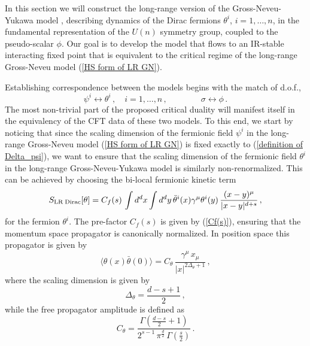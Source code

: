 \documentclass[aps,amsmath,amssymb,prd,showpacs,floatfix,preprint,superscriptaddress,nofootinbib,12pt]{article}
\begin{document}
In this section we will construct the long-range version of the
Gross-Neveu-Yukawa model \cite{Zinn-Justin:1991ksq}, describing
dynamics of the Dirac fermions $\theta^i$, $i=1,\dots,n$,
in the fundamental representation of the $U(n)$ symmetry group,
coupled to the pseudo-scalar $\phi$.
Our goal is to develop the model that flows to an IR-stable interacting fixed point
that is equivalent to the critical regime of the long-range Gross-Neveu model (\ref{HS form of LR GN}).

Establishing
 correspondence between the models begins
with the match of d.o.f.,
\begin{equation}
\psi^i\leftrightarrow\theta^i\,,\quad i = 1,\dots,n\,,\qquad\qquad \sigma\leftrightarrow\phi\,.
\end{equation}
The most non-trivial part of the proposed critical duality will manifest
itself in the equivalency of the CFT data of these two models. To this end, we start by noticing that
since the scaling dimension of the fermionic field $\psi^i$ in the long-range Gross-Neveu model
(\ref{HS form of LR GN}) is fixed exactly to (\ref{definition of Delta_psi}), we want to ensure
that the scaling dimension of the fermionic field $\theta^i$ in the long-range Gross-Neveu-Yukawa model
is similarly non-renormalized. This can be achieved by choosing
the bi-local fermionic kinetic term
\begin{equation}
\label{free generalized theta action}
S_{\textrm{LR\;Dirac}}[\theta] =C_f(s)\, \int d^dx\int d^dy\,\bar\theta^i(x)\gamma^\mu\theta^i(y)
\,\frac{(x-y)^\mu}{|x-y|^{d+s}}\,,
\end{equation}
for the fermion $\theta^i$.
The pre-factor $C_f(s)$ is given by (\ref{Cf(s)}),
ensuring that the momentum space propagator 
is canonically normalized. In position space this propagator is given by
\begin{equation}
\label{free theta prop}
\langle \theta(x)\bar\theta(0)\rangle = C_\theta\,\frac{\gamma^\mu\, x_\mu}{|x|^{2\Delta_\theta+1}}\,,
\end{equation}
where the scaling dimension is given by
\begin{equation}
\Delta_\theta = \frac{d-s+1}{2}\,,
\end{equation}
while the free propagator
amplitude is defined as
\begin{equation}
C_\theta = \frac{\Gamma\left(\frac{d-s}{2}+1\right)}{2^{s-1}\,\pi^\frac{d}{2}\,\Gamma\left(\frac{s}{2}\right)}\,.
\end{equation}
\end{document}
